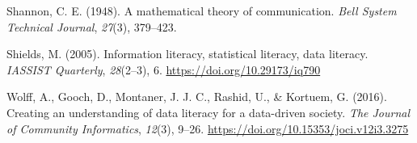 \documentclass[
  12pt,
  a4paper,
  twoside]{article}
\newlength{\cslhangindent}
\newenvironment{CSLReferences}[2] %
 {\begin{list}{}{%
  \setlength{\itemindent}{0pt}
  \setlength{\leftmargin}{0pt}
  \setlength{\parsep}{0pt}
  \ifodd #1
   \setlength{\leftmargin}{\cslhangindent}
   \setlength{\itemindent}{-1\cslhangindent}
  \fi
  \setlength{\itemsep}{#2\baselineskip}}}
 {\end{list}}
\begin{document}
\begin{CSLReferences}{1}{0}
Shannon, C. E. (1948). A mathematical theory of communication.
\emph{Bell System Technical Journal}, \emph{27}(3), 379--423.

Shields, M. (2005). Information literacy, statistical literacy, data
literacy. \emph{IASSIST Quarterly}, \emph{28}(2--3), 6.
\url{https://doi.org/10.29173/iq790}

Wolff, A., Gooch, D., Montaner, J. J. C., Rashid, U., \& Kortuem, G.
(2016). Creating an understanding of data literacy for a data-driven
society. \emph{The Journal of Community Informatics}, \emph{12}(3),
9--26. \url{https://doi.org/10.15353/joci.v12i3.3275}

\end{CSLReferences}
\end{document}

